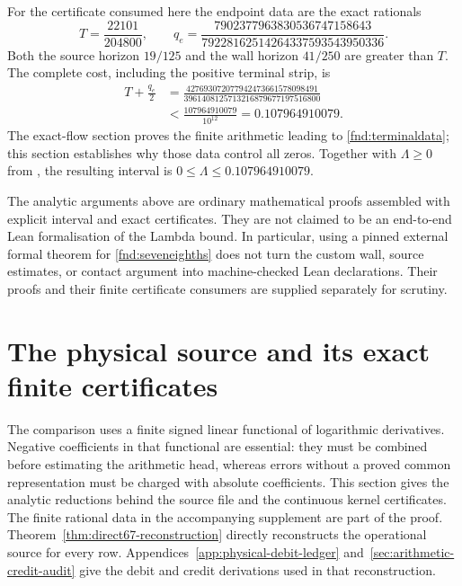 \documentclass[11pt,a4paper]{article}
\theoremstyle{definition}
\theoremstyle{remark}
\begin{document}
For the certificate consumed here the endpoint data are the exact rationals
\begin{equation}
 T=\frac{22101}{204800},\qquad
 q_e=\frac{7902377963830536747158643}
           {79228162514264337593543950336}.
 \label{fnd:terminaldata}
\end{equation}
Both the source horizon $19/125$ and the wall horizon $41/250$ are greater
than $T$. The complete cost, including the positive terminal strip, is
\begin{align}
 T+\frac{q_e}{2}
 &=\frac{427693072077942473661578098491}
          {3961408125713216879677197516800}\label{fnd:exactendpoint}\\
 &<\frac{107964910079}{10^{12}}=0.107964910079.
 \label{fnd:decimalendpoint}
\end{align}
The exact-flow section proves the finite arithmetic leading to
\eqref{fnd:terminaldata}; this section establishes why those data control
all zeros. Together with $\Lambda\geq0$ from \cite{RodgersTao}, the resulting
interval is $0\leq\Lambda\leq0.107964910079$.

The analytic arguments above are ordinary mathematical proofs assembled
with explicit interval and exact certificates. They are not claimed to
be an end-to-end Lean formalisation of the Lambda bound. In particular,
using a pinned external formal theorem for \eqref{fnd:seveneighths}
does not turn the custom wall, source estimates, or contact argument into
machine-checked Lean declarations. Their proofs and their finite
certificate consumers are supplied separately for scrutiny.



\section{The physical source and its exact finite certificates}
\label{src:section}

The comparison uses a finite signed linear functional of logarithmic
derivatives.  Negative coefficients in that functional are essential: they
must be combined before estimating the arithmetic head, whereas errors
without a proved common representation must be charged with absolute
coefficients.  This section gives the analytic reductions behind the source
file and the continuous kernel certificates.  The finite rational data in
the accompanying supplement are part of the proof.
Theorem~\ref{thm:direct67-reconstruction} directly reconstructs the operational
source for every row. Appendices~\ref{app:physical-debit-ledger}
and~\ref{sec:arithmetic-credit-audit} give the debit and credit
derivations used in that reconstruction.
\end{document}
